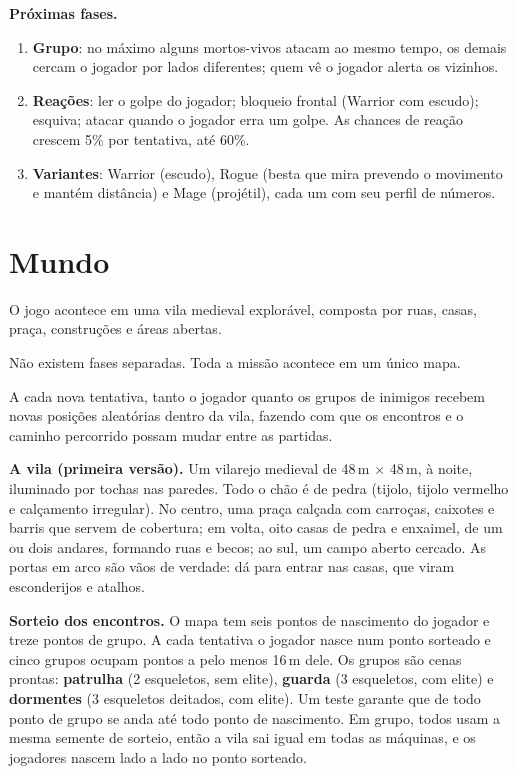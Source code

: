 \documentclass[11pt,a4paper]{article}
\begin{document}
\textbf{Próximas fases.}
\begin{enumerate}
    \item \textbf{Grupo}: no máximo alguns mortos-vivos atacam ao mesmo tempo, os demais cercam o jogador por lados diferentes; quem vê o jogador alerta os vizinhos.
    \item \textbf{Reações}: ler o golpe do jogador; bloqueio frontal (Warrior com escudo); esquiva; atacar quando o jogador erra um golpe. As chances de reação crescem 5\% por tentativa, até 60\%.
    \item \textbf{Variantes}: Warrior (escudo), Rogue (besta que mira prevendo o movimento e mantém distância) e Mage (projétil), cada um com seu perfil de números.
\end{enumerate}

\section{Mundo}

O jogo acontece em uma vila medieval explorável, composta por ruas, casas, praça, construções e áreas abertas.

Não existem fases separadas. Toda a missão acontece em um único mapa.

A cada nova tentativa, tanto o jogador quanto os grupos de inimigos recebem novas posições aleatórias dentro da vila, fazendo com que os encontros e o caminho percorrido possam mudar entre as partidas.

\textbf{A vila (primeira versão).} Um vilarejo medieval de 48\,m $\times$ 48\,m, à noite, iluminado por tochas nas paredes. Todo o chão é de pedra (tijolo, tijolo vermelho e calçamento irregular). No centro, uma praça calçada com carroças, caixotes e barris que servem de cobertura; em volta, oito casas de pedra e enxaimel, de um ou dois andares, formando ruas e becos; ao sul, um campo aberto cercado. As portas em arco são vãos de verdade: dá para entrar nas casas, que viram esconderijos e atalhos.

\textbf{Sorteio dos encontros.} O mapa tem seis pontos de nascimento do jogador e treze pontos de grupo. A cada tentativa o jogador nasce num ponto sorteado e cinco grupos ocupam pontos a pelo menos 16\,m dele. Os grupos são cenas prontas: \textbf{patrulha} (2 esqueletos, sem elite), \textbf{guarda} (3 esqueletos, com elite) e \textbf{dormentes} (3 esqueletos deitados, com elite). Um teste garante que de todo ponto de grupo se anda até todo ponto de nascimento. Em grupo, todos usam a mesma semente de sorteio, então a vila sai igual em todas as máquinas, e os jogadores nascem lado a lado no ponto sorteado.
\end{document}

